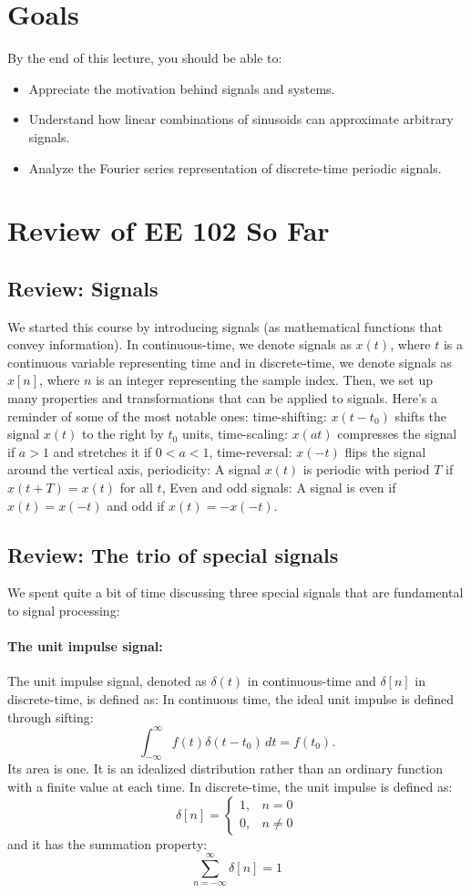 \section{Goals}
By the end of this lecture, you should be able to:
\begin{itemize}
\item Appreciate the motivation behind signals and systems. 
\item Understand how linear combinations of sinusoids can approximate arbitrary signals.
\item Analyze the Fourier series representation of discrete-time periodic signals.
\end{itemize}

\section{Review of EE 102 So Far}
\subsection{Review: Signals}
We started this course by introducing signals (as mathematical functions that convey information). In continuous-time, we denote signals as $x(t)$, where $t$ is a continuous variable representing time and in discrete-time, we denote signals as $x[n]$, where $n$ is an integer representing the sample index. Then, we set up many properties and transformations that can be applied to signals. Here's a reminder of some of the most notable ones: time-shifting: $x(t - t_0)$ shifts the signal $x(t)$ to the right by $t_0$ units, time-scaling: $x(at)$ compresses the signal if $a > 1$ and stretches it if $0 < a < 1$, time-reversal: $x(-t)$ flips the signal around the vertical axis, periodicity: A signal $x(t)$ is periodic with period $T$ if $x(t + T) = x(t)$ for all $t$, Even and odd signals: A signal is even if $x(t) = x(-t)$ and odd if $x(t) = -x(-t)$.
\subsection{Review: The trio of special signals}
We spent quite a bit of time discussing three special signals that are fundamental to signal processing:

\paragraph{The unit impulse signal:} The unit impulse signal, denoted as $\delta(t)$ in continuous-time and $\delta[n]$ in discrete-time, is defined as:
In continuous time, the ideal unit impulse is defined through sifting:
\[
\int_{-\infty}^{\infty} f(t)\delta(t-t_0)\,dt=f(t_0).
\]
Its area is one. It is an idealized distribution rather than an ordinary
function with a finite value at each time.
In discrete-time, the unit impulse is defined as:
\[
\delta[n] = \begin{cases}
1, & n = 0 \\
0, & n \neq 0
\end{cases}
\]
and it has the summation property:
\[
\sum_{n=-\infty}^{\infty} \delta[n] = 1
\]

